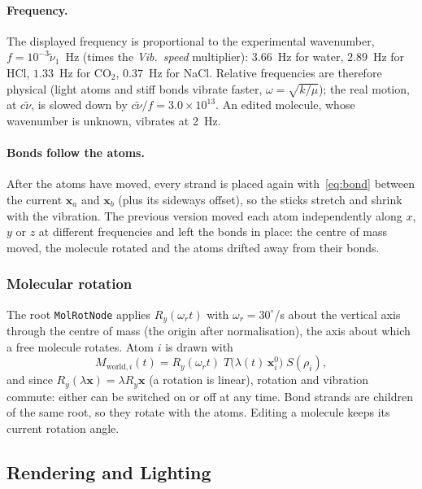 \documentclass[a4paper, 11pt]{article}
\newcommand{\code}[1]{\texttt{#1}}
\begin{document}
\paragraph{Frequency.} The displayed frequency is proportional to the experimental wavenumber, $f=10^{-3}\tilde\nu_1$~Hz (times the \emph{Vib.\ speed}
multiplier): $3.66$~Hz for water, $2.89$~Hz for HCl, $1.33$~Hz for CO$_2$, $0.37$~Hz for NaCl. Relative frequencies are therefore physical (light
atoms and stiff bonds vibrate faster, $\omega=\sqrt{k/\mu}$); the real motion, at $c\tilde\nu$, is slowed down by $c\tilde\nu/f=3.0\times10^{13}$. An
edited molecule, whose wavenumber is unknown, vibrates at 2~Hz.

\paragraph{Bonds follow the atoms.} After the atoms have moved, every strand is placed again with~\eqref{eq:bond} between the current
$\mathbf x_a$ and $\mathbf x_b$ (plus its sideways offset), so the sticks stretch and shrink with the vibration. The previous version moved each atom
independently along $x$, $y$ or $z$ at different frequencies and left the bonds in place: the centre of mass moved, the molecule rotated and
the atoms drifted away from their bonds.

\subsubsection{Molecular rotation}

The root \code{MolRotNode} applies $R_y(\omega_r t)$ with $\omega_r=30^\circ$/s about the vertical axis through the centre of mass (the origin after
normalisation), the axis about which a free molecule rotates. Atom $i$ is drawn with
\[
  M_{\text{world},i}(t)=R_y(\omega_r t)\;T\bigl(\lambda(t)\,\mathbf x_i^0\bigr)\;S(\rho_i),
\]
and since $R_y(\lambda\mathbf x)=\lambda R_y\mathbf x$ (a rotation is linear), rotation and vibration commute: either can be switched on or off at
any time. Bond strands are children of the same root, so they rotate with the atoms. Editing a molecule keeps its current rotation angle.

\subsection{Rendering and Lighting}\label{sec:render2}
\end{document}
